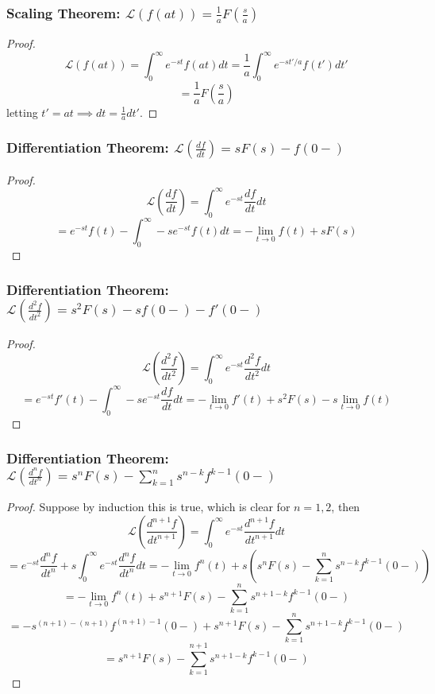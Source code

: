 \documentclass[11pt]{article}
\begin{document}
\subsubsection{Scaling Theorem: $\mathcal{L}(f(at))  = \frac{1}{a}F(\frac{s}{a})$}

\begin{proof}
	\[\mathcal{L}(f(at))  =  \int_0^{\infty} e^{-st}f(at) dt = \frac{1}{a}\int_0^{\infty} e^{-st'/a}f(t') dt'\]
	\[= \frac{1}{a} F(\frac{s}{a})\] letting $t' = at \implies dt = \frac{1}{a} dt'$.
\end{proof}

\subsubsection{Differentiation Theorem: $\mathcal{L}(\frac{df}{dt}) = sF(s) - f(0-)$}
\begin{proof}
	\[\mathcal{L}(\frac{df}{dt})  = \int_0^{\infty} e^{-st} \frac{df}{dt} dt\]
	\[= e^{-st} f(t) - \int_0^{\infty} -s e^{-st} f(t) dt = - \lim_{t \to 0} f(t) + sF(s)\]
\end{proof}

\subsubsection{Differentiation Theorem: $\mathcal{L}(\frac{d^2f}{dt^2}) = s^2F(s) - sf(0-) - f'(0-)$}

\begin{proof}
	\[\mathcal{L}(\frac{d^2f}{dt^2}) = \int_0^{\infty} e^{-st} \frac{d^2f}{dt^2} dt\]
	\[= e^{-st} f'(t) - \int_0^{\infty} -se^{-st} \frac{df}{dt} dt = -\lim_{t \to 0}f'(t) + s^2F(s) - s\lim_{t \to 0}f(t)\]
\end{proof}

\subsubsection{Differentiation Theorem: $\mathcal{L}(\frac{d^nf}{dt^n}) = s^nF(s) - \sum_{k = 1}^n s^{n - k} f^{k - 1}(0-)$}
\begin{proof}
	Suppose by induction this is true, which is clear for $n = 1, 2$, then 
	\[\mathcal{L}(\frac{d^{n + 1}f}{dt^{n + 1}}) = \int_0^{\infty} e^{-st} \frac{d^{n + 1}f}{dt^{n + 1}} dt\]
	\[ = e^{-st} \frac{d^nf}{dt^n} + s \int_0^{\infty} e^{-st} \frac{d^nf}{dt^n} dt = -\lim_{t\to 0} f^n(t) + s\left( s^nF(s) - \sum_{k = 1}^n s^{n - k} f^{k - 1}(0-)\right) \]
	\[= -\lim_{t\to 0} f^n(t) +  s^{n + 1}F(s) - \sum_{k = 1}^n s^{n + 1 - k} f^{k - 1}(0-) \]
	\[= -s^{(n + 1) - (n + 1)} f^{(n + 1) - 1} (0-)  +  s^{n + 1}F(s) - \sum_{k = 1}^n s^{n + 1 - k} f^{k - 1}(0-) \]
	\[= s^{n + 1}F(s) - \sum_{k = 1}^{n + 1} s^{n + 1 - k} f^{k - 1}(0-)\]
\end{proof}
\end{document}
